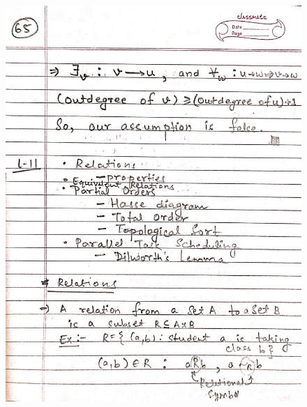 \begin{figure}[H]
    \centering
    \includegraphics[width=16cm, height=21cm]{"./MIT-6.042J/MIT-6042J-065"}
\end{figure}
\newpage
